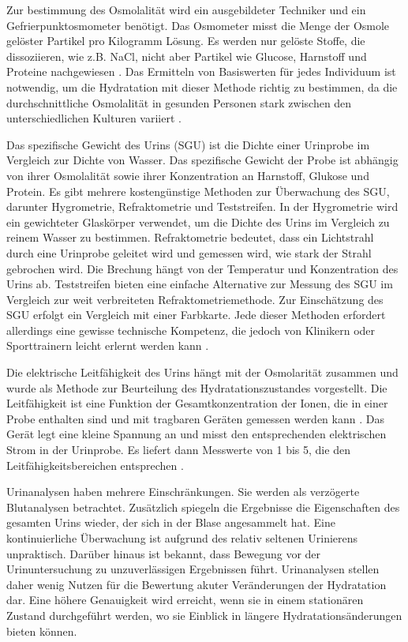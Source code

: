 \documentclass[10pt,a4paper,headinclude,twoside, plainheadsepline, open=right, numbers=noenddot, twocolumn]{article}
\begin{document}
Zur bestimmung des Osmolalität wird ein ausgebildeter Techniker und ein Gefrierpunktosmometer benötigt.
Das Osmometer misst die Menge der Osmole gelöster Partikel pro Kilogramm Lösung. 
Es werden nur gelöste Stoffe, die dissoziieren, wie z.B. NaCl, nicht aber Partikel wie Glucose, Harnstoff und Proteine nachgewiesen \cite{oppliger2002hydration}. 
Das Ermitteln von Basiswerten für jedes Individuum ist notwendig, um die Hydratation mit dieser Methode richtig zu bestimmen, da die durchschnittliche Osmolalität in gesunden Personen stark zwischen den unterschiedlichen Kulturen variiert \cite{garret2018engineering}.

Das spezifische Gewicht des Urins (SGU) ist die Dichte einer Urinprobe im Vergleich zur Dichte von Wasser.
Das spezifische Gewicht der Probe ist abhängig von ihrer Osmolalität sowie ihrer Konzentration an Harnstoff, Glukose und Protein. 
Es gibt mehrere kostengünstige Methoden zur Überwachung des SGU, darunter Hygrometrie, Refraktometrie und Teststreifen. 
In der Hygrometrie wird ein gewichteter Glaskörper verwendet, um die Dichte des Urins im Vergleich zu reinem Wasser zu bestimmen.
Refraktometrie bedeutet, dass ein Lichtstrahl durch eine Urinprobe geleitet wird und gemessen wird, wie stark der Strahl gebrochen wird.
Die Brechung hängt von der Temperatur und Konzentration des Urins ab.
Teststreifen bieten eine einfache Alternative zur Messung des SGU im Vergleich zur weit verbreiteten Refraktometriemethode.
Zur Einschätzung des SGU erfolgt ein Vergleich mit einer Farbkarte.
Jede dieser Methoden erfordert allerdings eine gewisse technische Kompetenz, die jedoch von Klinikern oder Sporttrainern leicht erlernt werden kann \cite{oppliger2002hydration}.

Die elektrische Leitfähigkeit des Urins hängt mit der Osmolarität zusammen und wurde als Methode zur Beurteilung des Hydratationszustandes vorgestellt.
Die Leitfähigkeit ist eine Funktion der Gesamtkonzentration der Ionen, die in einer Probe enthalten sind und mit tragbaren Geräten  gemessen werden kann \cite{shirreffs1998urine}.
Das Gerät legt eine kleine Spannung an und misst den entsprechenden elektrischen Strom in der Urinprobe.
Es liefert dann Messwerte von 1 bis 5, die den Leitfähigkeitsbereichen entsprechen \cite{garret2018engineering}.

Urinanalysen haben mehrere Einschränkungen.
Sie werden als verzögerte Blutanalysen betrachtet.
Zusätzlich spiegeln die Ergebnisse die Eigenschaften des gesamten Urins wieder, der sich in der Blase angesammelt hat.
Eine kontinuierliche Überwachung ist aufgrund des relativ seltenen Urinierens unpraktisch.
Darüber hinaus ist bekannt, dass Bewegung vor der Urinuntersuchung zu unzuverlässigen Ergebnissen führt.
Urinanalysen stellen daher wenig Nutzen für die Bewertung akuter Veränderungen der Hydratation dar.
Eine höhere Genauigkeit wird erreicht, wenn sie in einem stationären Zustand durchgeführt werden, wo sie Einblick in längere Hydratationsänderungen bieten können.
\end{document}
